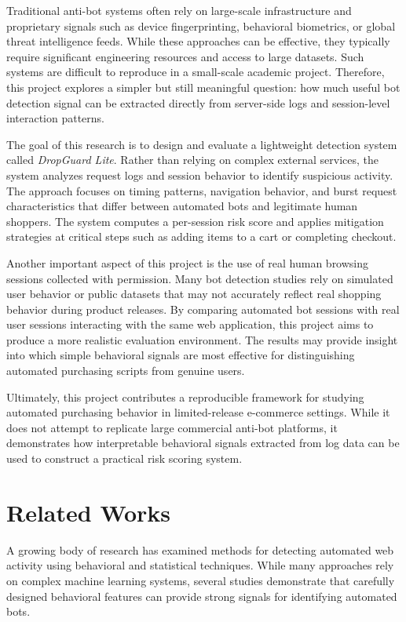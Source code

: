 \documentclass[12pt]{article}
\begin{document}
Traditional anti-bot systems often rely on large-scale infrastructure and proprietary signals such as device fingerprinting, behavioral biometrics, or global threat intelligence feeds. While these approaches can be effective, they typically require significant engineering resources and access to large datasets. Such systems are difficult to reproduce in a small-scale academic project. Therefore, this project explores a simpler but still meaningful question: how much useful bot detection signal can be extracted directly from server-side logs and session-level interaction patterns.

The goal of this research is to design and evaluate a lightweight detection system called \textit{DropGuard Lite}. Rather than relying on complex external services, the system analyzes request logs and session behavior to identify suspicious activity. The approach focuses on timing patterns, navigation behavior, and burst request characteristics that differ between automated bots and legitimate human shoppers. The system computes a per-session risk score and applies mitigation strategies at critical steps such as adding items to a cart or completing checkout.

Another important aspect of this project is the use of real human browsing sessions collected with permission. Many bot detection studies rely on simulated user behavior or public datasets that may not accurately reflect real shopping behavior during product releases. By comparing automated bot sessions with real user sessions interacting with the same web application, this project aims to produce a more realistic evaluation environment. The results may provide insight into which simple behavioral signals are most effective for distinguishing automated purchasing scripts from genuine users.

Ultimately, this project contributes a reproducible framework for studying automated purchasing behavior in limited-release e-commerce settings. While it does not attempt to replicate large commercial anti-bot platforms, it demonstrates how interpretable behavioral signals extracted from log data can be used to construct a practical risk scoring system.

\section{Related Works}

A growing body of research has examined methods for detecting automated web activity using behavioral and statistical techniques. While many approaches rely on complex machine learning systems, several studies demonstrate that carefully designed behavioral features can provide strong signals for identifying automated bots.
\end{document}
